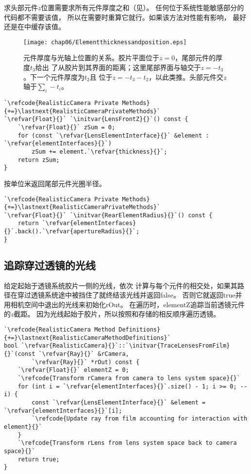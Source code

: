 求头部元件$z$位置需要求所有元件厚度之和（见）。
任何位于系统性能敏感部分的代码都不需要该值，
所以在需要时重算它就行。如果该方法对性能有影响，
最好还是在中缓存该值。
\begin{figure}[htbp]
    \centering\texttt{[image: chap06/Elementthicknessandposition.eps]}
    \caption{元件厚度与光轴上位置的关系。胶片平面位于$z=0$，尾部元件的厚度$t_3$给出
        了从胶片到其界面的距离；这里尾部界面与轴交于$z=-t_3$。下一个元件厚度为$t_2$且
        位于$z=-t_3-t_2$，以此类推。头部元件交$z$轴于$\sum_i-t_i$。}
    \label{fig:6.18}
\end{figure}
\begin{lstlisting}
`\refcode{RealisticCamera Private Methods}{+=}\lastnext{RealisticCameraPrivateMethods}`
`\refvar{Float}{}` `\initvar{LensFrontZ}{}`() const {
    `\refvar{Float}{}` zSum = 0;
    for (const `\refvar{LensElementInterface}{}` &element : `\refvar{elementInterfaces}{}`)
        zSum += element.`\refvar{thickness}{}`;
    return zSum;
}
\end{lstlisting}

按单位米返回尾部元件光圈半径。
\begin{lstlisting}
`\refcode{RealisticCamera Private Methods}{+=}\lastnext{RealisticCameraPrivateMethods}`
`\refvar{Float}{}` `\initvar{RearElementRadius}{}`() const {
    return `\refvar{elementInterfaces}{}`.back().`\refvar{apertureRadius}{}`;
}
\end{lstlisting}
\subsection{追踪穿过透镜的光线}\label{sub:追踪穿过透镜的光线}
给定起始于透镜系统胶片一侧的光线，依次
计算与每个元件的相交处，如果其路径在穿过透镜系统途中被挡住了就终结该光线并返回{\ttfamily false}。
否则它就返回{\ttfamily true}并用相机空间中退出的光线来初始化{\ttfamily *rOut}。
在遍历时，{\ttfamily elementZ}追踪当前透镜元件的$z$截距。
因为光线起始于胶片，所以按照和存储的相反顺序遍历透镜。
\begin{lstlisting}
`\refcode{RealisticCamera Method Definitions}{+=}\lastnext{RealisticCameraMethodDefinitions}`
bool `\refvar{RealisticCamera}{}`::`\initvar{TraceLensesFromFilm}{}`(const `\refvar{Ray}{}` &rCamera,
        `\refvar{Ray}{}` *rOut) const {
    `\refvar{Float}{}` elementZ = 0;
    `\refcode{Transform rCamera from camera to lens system space}{}`
    for (int i = `\refvar{elementInterfaces}{}`.size() - 1; i >= 0; --i) {
        const `\refvar{LensElementInterface}{}` &element = `\refvar{elementInterfaces}{}`[i];
        `\refcode{Update ray from film accounting for interaction with element}{}`
    }
    `\refcode{Transform rLens from lens system space back to camera space}{}`
    return true;
}
\end{lstlisting}

